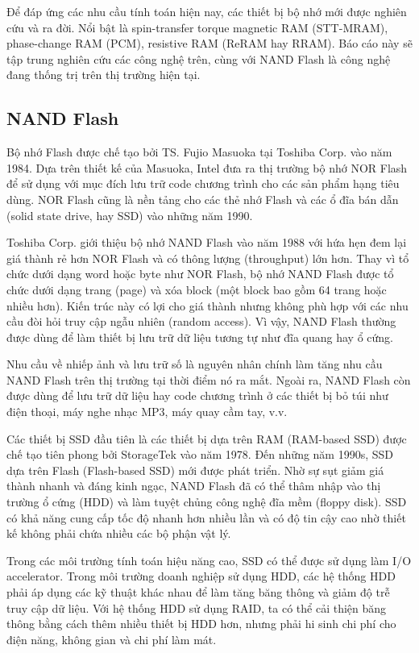 Để đáp ứng các nhu cầu tính toán hiện nay, các thiết bị bộ nhớ mới được nghiên
cứu và ra đời. Nổi bật là spin-transfer torque magnetic RAM (STT-MRAM),
phase-change RAM (PCM), resistive RAM (ReRAM hay RRAM). Báo cáo này sẽ tập
trung nghiên cứu các công nghệ trên, cùng với NAND Flash là công nghệ đang
thống trị trên thị trường hiện tại.

\subsection{NAND Flash}
Bộ nhớ Flash được chế tạo bởi TS. Fujio Masuoka tại Toshiba Corp. vào năm 1984.
Dựa trên thiết kế của Masuoka, Intel đưa ra thị trường bộ nhớ NOR Flash để sử
dụng với mục đích lưu trữ code chương trình cho các sản phẩm hạng tiêu dùng.
NOR Flash cũng là nền tảng cho các thẻ nhớ Flash và các ổ đĩa bán dẫn (solid
state drive, hay SSD) vào những năm 1990.

Toshiba Corp. giới thiệu bộ nhớ NAND Flash vào năm 1988 với hứa hẹn đem lại giá
thành rẻ hơn NOR Flash và có thông lượng (throughput) lớn hơn. Thay vì tổ chức
dưới dạng word hoặc byte như NOR Flash, bộ nhớ NAND Flash được tổ chức dưới dạng
trang (page) và xóa block (một block bao gồm 64 trang hoặc nhiều hơn). Kiến trúc
này có lợi cho giá thành nhưng không phù hợp với các nhu cầu đòi hỏi truy cập
ngẫu nhiên (random access). Vì vậy, NAND Flash thường được dùng để làm thiết bị
lưu trữ dữ liệu tương tự như đĩa quang hay ổ cứng.


Nhu cầu về nhiếp ảnh và lưu trữ số là nguyên nhân chính làm tăng nhu cầu NAND
Flash trên thị trường tại thời điểm nó ra mắt. Ngoài ra, NAND Flash còn được
dùng để lưu trữ dữ liệu hay code chương trình ở các thiết bị bỏ túi như điện
thoại, máy nghe nhạc MP3, máy quay cầm tay, v.v.

Các thiết bị SSD đầu tiên là các thiết bị dựa trên RAM (RAM-based SSD) được chế
tạo tiên phong bởi StorageTek vào năm 1978. Đến những năm 1990s, SSD dựa trên
Flash (Flash-based SSD) mới được phát triển. Nhờ sự sụt giảm giá thành nhanh và
đáng kinh ngạc, NAND Flash đã có thể thâm nhập vào thị trường ổ cứng (HDD) và
làm tuyệt chủng công nghệ đĩa mềm (floppy disk). SSD có khả năng cung cấp tốc
độ nhanh hơn nhiều lần và có độ tin cậy cao nhờ thiết kế không phải chứa nhiều
các bộ phận vật lý.

Trong các môi trường tính toán hiệu năng cao, SSD có thể được sử dụng làm I/O
accelerator. Trong môi trường doanh nghiệp sử dụng HDD, các hệ thống HDD phải áp
dụng các kỹ thuật khác nhau để làm tăng băng thông và giảm độ trễ truy cập dữ
liệu. Với hệ thống HDD sử dụng RAID, ta có thể cải thiện băng thông bằng cách
thêm nhiều thiết bị HDD hơn, nhưng phải hi sinh chi phí cho điện năng, không
gian và chi phí làm mát.

